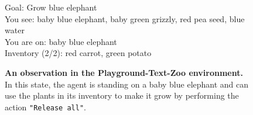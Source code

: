 \begin{figure}[htbp]
\centering
\begin{tcolorbox}[myboxstyle]
Goal: Grow blue elephant\\
You see: baby blue elephant, baby green grizzly, red pea seed, blue water\\
You are on: baby blue elephant\\
Inventory (2/2): red carrot, green potato
\end{tcolorbox}
\caption{\textbf{An observation in the Playground-Text-Zoo environment.} In this state, the agent is standing on a baby blue elephant and can use the plants in its inventory to make it grow by performing the action \texttt{"Release all"}.}
\label{fig:playground_obs}
\end{figure}




